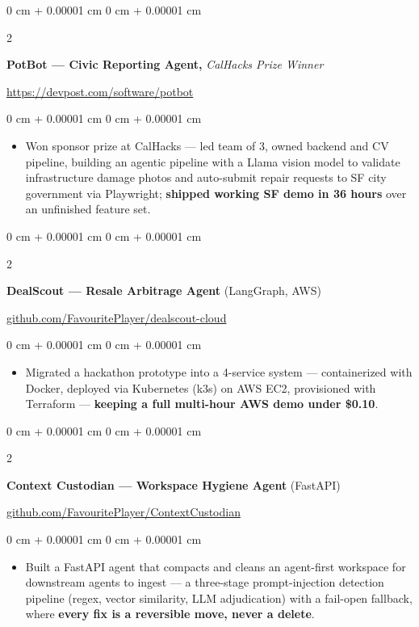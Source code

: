 \documentclass[10pt, letterpaper]{article}
\newenvironment{highlights}{
    \begin{itemize}[
        topsep=0.3 cm,
        parsep=0.09 cm,
        partopsep=0pt,
        itemsep=0.05 cm,
        leftmargin=0 cm + 10pt
    ]
}{
    \end{itemize}
} %
\newenvironment{onecolentry}{
    \begin{adjustwidth}{
        0 cm + 0.00001 cm
    }{
        0 cm + 0.00001 cm
    }
}{
    \end{adjustwidth}
} %
\newenvironment{extendedtwocolentry}[2][]{
    \onecolentry
    \def\secondColumn{#2}
    \setcolumnwidth{\fill, 8 cm}
    \begin{paracol}{2}
}{
    \switchcolumn \raggedleft \secondColumn
    \end{paracol}
    \endonecolentry
}
\begin{document}
        \begin{extendedtwocolentry}{
            \href{https://devpost.com/software/potbot}{https://devpost.com/software/potbot}
        }
            \textbf{PotBot — Civic Reporting Agent,} \textit{CalHacks Prize Winner}
        \end{extendedtwocolentry}

        \vspace{0.11 cm}
        \begin{onecolentry}
            \begin{highlights}
                \item Won sponsor prize at CalHacks — led team of 3, owned backend and CV pipeline, building an agentic pipeline with a Llama vision model to validate infrastructure damage photos and auto-submit repair requests to SF city government via Playwright; \textbf{shipped working SF demo in 36 hours} over an unfinished feature set.
            \end{highlights}
        \end{onecolentry}

        \begin{extendedtwocolentry}{
            \href{https://github.com/FavouritePlayer/dealscout-cloud}{github.com/FavouritePlayer/dealscout-cloud}
        }
            \textbf{DealScout — Resale Arbitrage Agent} (LangGraph, AWS)
        \end{extendedtwocolentry}

        \vspace{0.11 cm}
        \begin{onecolentry}
            \begin{highlights}
                \item Migrated a hackathon prototype into a 4-service system — containerized with Docker, deployed via Kubernetes (k3s) on AWS EC2, provisioned with Terraform — \textbf{keeping a full multi-hour AWS demo under \$0.10}.
            \end{highlights}
        \end{onecolentry}

        \begin{extendedtwocolentry}{
            \href{https://github.com/FavouritePlayer/ContextCustodian}{github.com/FavouritePlayer/ContextCustodian}
        }
            \textbf{Context Custodian — Workspace Hygiene Agent} (FastAPI)
        \end{extendedtwocolentry}

        \vspace{0.11 cm}
        \begin{onecolentry}
            \begin{highlights}
                \item Built a FastAPI agent that compacts and cleans an agent-first workspace for downstream agents to ingest — a three-stage prompt-injection detection pipeline (regex, vector similarity, LLM adjudication) with a fail-open fallback, where \textbf{every fix is a reversible move, never a delete}.
            \end{highlights}
        \end{onecolentry}
\end{document}
